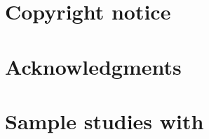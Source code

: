 \documentclass[10pt]{book}
\begin{document}
\frontmatter

\begin{titlepage}
  \maketitle
\end{titlepage}

\tableofcontents
\listoffigures
\listoftables
\newpage

\chapter{Copyright notice}

\newpage

\chapter{Acknowledgments}


\mainmatter

\chapter{Sample studies with \MDT} \label{CHAPTEREXAMPLES}
    

\clearpage
\backmatter




\printindex
\end{document}
